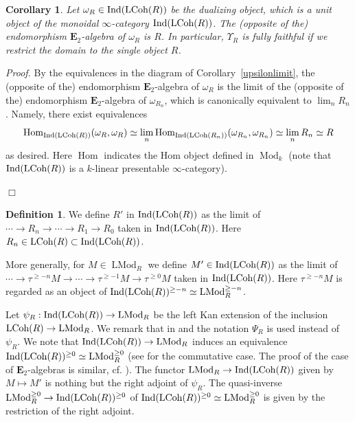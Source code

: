 \documentclass[leqno,12pt]{amsart}
\theoremstyle{plain}
\newtheorem{Corollary}[Theorem]{Corollary}
\theoremstyle{definition}
\newtheorem{Definition}[Theorem]{Definition}
\newcommand{\Hom}{\operatorname{Hom}}
\newcommand{\Mod}{\operatorname{Mod}}
\newcommand{\Ind}{\operatorname{Ind}}
\newcommand{\etwo}{\mathbf{E}_2}
\newcommand{\LMod}{\operatorname{LMod}}
\newcommand{\Proof}{{\sl Proof.}\quad}
\newcommand{\QED}{{\unskip\nobreak\hfil\penalty50\quad\null\nobreak\hfil
{$\Box$}\parfillskip0pt\finalhyphendemerits0\par\medskip}}
\begin{document}
\begin{Corollary}
\label{omegaend}
Let $\omega_R\in \Ind(\textup{LCoh}(R))$ be the dualizing object, which is a unit object of the monoidal $\infty$-category
$\Ind(\textup{LCoh}(R))$.
The (opposite of the) endomorphism $\etwo$-algebra of $\omega_R$ is $R$.
In particular, $\Upsilon_R$ is fully faithful if we restrict the domain to the single object $R$. 
\end{Corollary}


\Proof
By the equivalences in the diagram of Corollary~\ref{upsilonlimit}, the (opposite of the) endomorphism $\etwo$-algebra of $\omega_R$
is the limit of the (opposite of the) endomorphism $\etwo$-algebra of $\omega_{R_n}$,
 which is canonically equivalent to $\lim_nR_n$. Namely, there exist equivalences
 \[
\Hom_{\Ind(\textup{LCoh}(R))}(\omega_R,\omega_R)\simeq \lim_n\Hom_{\Ind(\textup{LCoh}(R_n))}(\omega_{R_n},\omega_{R_n})\simeq \lim_nR_n\simeq R
\]
as desired. Here $\Hom$ indicates the Hom object defined in $\Mod_k$ (note that $\Ind(\textup{LCoh}(R))$ is a $k$-linear presentable $\infty$-category).
\QED


\begin{Definition}
We define $R'$ in $\Ind(\textup{LCoh}(R))$ as the limit of $\cdots \to R_n\to \cdots \to R_1\to R_0$
taken in $\Ind(\textup{LCoh}(R))$. Here $R_n\in \textup{LCoh}(R)\subset \Ind(\textup{LCoh}(R))$.


More generally, for $M\in \LMod_R$ 
we define $M'\in \Ind(\textup{LCoh}(R))$ as the limit of $\cdots \to \tau^{\ge -n}M\to \cdots \to \tau^{\ge -1}M\to \tau^{\ge0}M$
taken in $\Ind(\textup{LCoh}(R))$. Here $\tau^{\ge -n}M$ is regarded as an object of $\Ind(\textup{LCoh}(R))^{\ge -n}\simeq \LMod_R^{\ge -n}$.
\end{Definition}

Let 
$\psi_R:\Ind(\textup{LCoh}(R))\to \LMod_R$ be the left Kan extension of the inclusion $\textup{LCoh}(R)\to \LMod_R$.
We remark that in \cite{Ind} and \cite{CKDA} the notation $\Psi_R$ is used instead of $\psi_R$. 
We note that $ \Ind(\textup{LCoh}(R))\to \LMod_R$ induces an equivalence
$\Ind(\textup{LCoh}(R))^{\ge0}\simeq \LMod_R^{\ge0}$
(see \cite[Proposition 1.2.4]{Ind} for the commutative case. The proof of the case of $\etwo$-algebras is similar, cf. \cite[the proof of Lemma 3.11]{IH}).
The functor $\LMod_R\to \Ind(\textup{LCoh}(R))$ given by $M\mapsto M'$ is nothing but the right adjoint of 
$\psi_R$.
The quasi-inverse $\LMod_R^{\ge0}\to \Ind(\textup{LCoh}(R))^{\ge0}$ of $ \Ind(\textup{LCoh}(R))^{\ge0}\simeq\LMod_R^{\ge0}$
is given by the restriction of the right adjoint.
\end{document}
